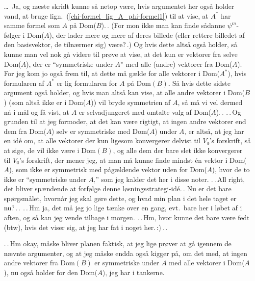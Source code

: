 \documentclass{report}
\begin{document}
\ldots\ Ja, og næste skridt kunne så netop være, hvis argumentet her også holder vand, at bruge lign.\ (\ref{chi-formel_lig_A_phi-formel1}) til at vise, at $A^*$ har samme formel som $A$ på Dom($B$).\,. (For mon ikke man kan finde sådanne $\psi^m$-følger i Dom($A$), der lader mere og mere af deres billede (eller rettere billedet af den basisvektor, de tilnærmer sig) være?\,.) Og hvis dette altså også holder, så kunne man vel nok gå videre til prøve at vise, at det kun er vektorer fra selve Dom($A$), der er ``symmetriske under $A$'' med alle (andre) vektorer fra Dom($A$). For jeg kom jo også frem til, at dette må gælde for alle vektorer i Dom($A^*$), hvis formularen af $A^*$ er lig formularen for $A$ på Dom$(B)$. Så hvis dette sidste argument også holder, og hvis man altså kan vise, at alle andre vektorer i Dom($B$) (som altså ikke er i Dom($A$)) vil bryde symmetrien af $A$, så må vi vel dermed nå i mål og få vist, at $A$ er selvadjungeret med omtalte valg af Dom($A$).\,. .\,.\,Og grunden til at jeg formoder, at det kan være rigtigt, at ingen andre vektorer end dem fra Dom($A$) selv er symmetriske med Dom($A$) under $A$, er altså, at jeg har en idé om, at alle vektorer der kun ligesom konvergerer delvist til $V_0$'s forskrift, så at sige, de vil ikke være i Dom$(B)$, og alle dem der bare slet ikke konvergerer til $V_0$'s forskrift, der mener jeg, at man må kunne finde mindst én vektor i Dom($A$), som ikke er symmetrisk med pågældende vektor uden for Dom($A$), hvor de to ikke er ``symmetriske under $A$,'' som jeg kalder det her i disse noter. .\,.\,All right, det bliver spændende at forfølge denne løsningsstrategi-idé.\,. Nu er det bare spørgsmålet, hvornår jeg skal gøre dette, og hvad min plan i det hele taget er nu?\,.\,. .\,.\,Hm ja, det må jeg jo lige tænke over en gang, evt.\ bare her i løbet af i aften, og så kan jeg vende tilbage i morgen. .\,.\,Hm, hvor kunne det bare være fedt (btw), hvis det viser sig, at jeg har fat i noget her.\,:)\,.\,. 

.\,.\,Hm okay, måske bliver planen faktisk, at jeg lige prøver at gå igennem de nævnte argumenter, og at jeg måske endda også kigger på, om det med, at ingen andre vektorer fra Dom$(B)$ er symmetriske under $A$ med alle vektorer i Dom($A$), nu også holder for den Dom($A$), jeg har i tankerne.
\end{document}
